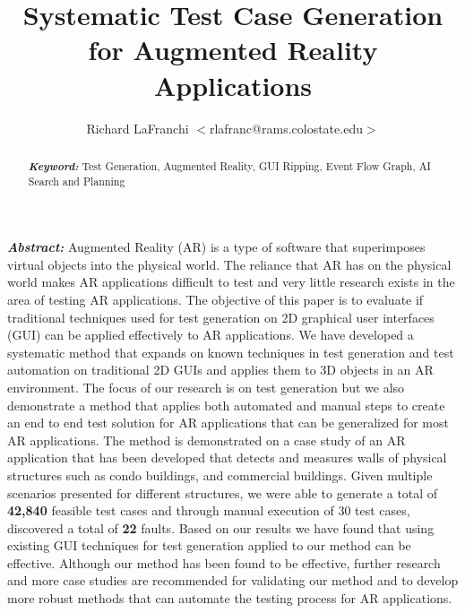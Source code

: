 \documentclass[final,3p]{CSP}
\begin{document}
\begin{frontmatter}

\title{Systematic Test Case Generation for Augmented Reality Applications}

\author[mymainaddress,mysecondaryaddress]{Richard LaFranchi $<$rlafranc@rams.colostate.edu$>$}


\address[mymainaddress]{MCS Student, Department of Computer Science}
\address[mysecondaryaddress]{Colorado State University, Fort Collins, Colorado}
\begin{abstract}\rm
\begin{adjustwidth}{2cm}{2cm}{\itshape\textbf{Keyword:}}
Test Generation, Augmented Reality, GUI Ripping, Event Flow Graph, AI Search and Planning
\end{adjustwidth}
\end{abstract}

\begin{keyword}\rm
\begin{adjustwidth}{2cm}{2cm}{\itshape\textbf{Abstract:}}
Augmented Reality (AR) is a type of software that superimposes virtual objects into the physical world.  The reliance that AR has on the physical world makes AR applications difficult to test and very little research exists in the area of testing AR applications.  The objective of this paper is to evaluate if traditional techniques used for test generation on 2D graphical user interfaces (GUI) can be applied effectively to AR applications.  We have developed a systematic method that expands on known techniques in test generation and test automation on traditional 2D GUIs and applies them to 3D objects in an AR environment.  The focus of our research is on test generation but we also demonstrate a method that applies both automated and manual steps to create an end to end test solution for AR applications that can be generalized for most AR applications.  The method is demonstrated on a case study of an AR application that has been developed that detects and measures walls of physical structures such as condo buildings, and commercial buildings.  Given multiple scenarios presented for different structures, we were able to generate a total of \textbf{42,840} feasible test cases and through manual execution of 30 test cases, discovered a total of \textbf{22} faults.  Based on our results we have found that using existing GUI techniques for test generation applied to our method can be effective.  Although our method has been found to be effective, further research and more case studies are recommended for validating our method and to develop more robust methods that can automate the testing process for AR applications.
\end{adjustwidth}
\end{keyword}
\end{frontmatter}
\end{document}
